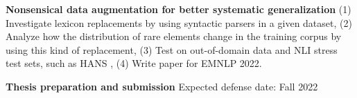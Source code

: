 \documentclass[12pt]{article}
\begin{document}
\halfblankline

\noindent \textbf{Nonsensical data augmentation for better systematic generalization} (1) Investigate lexicon replacements by using syntactic parsers in a given dataset, (2) Analyze how the distribution of rare elements change in the training corpus by using this kind of replacement, (3) Test on out-of-domain data and NLI stress test sets, such as HANS \cite{mccoy2019}, (4) Write paper for EMNLP 2022.

\halfblankline

\noindent \textbf{Thesis preparation and submission} Expected defense date: Fall 2022



\end{document}
